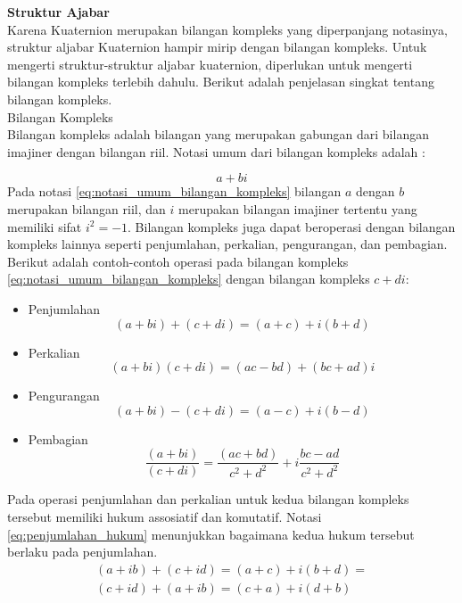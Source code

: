 \documentclass[a4paper,twoside]{article}
\begin{document}
\begin{enumerate}
\textbf{Struktur Ajabar}\\

Karena Kuaternion merupakan bilangan kompleks yang diperpanjang notasinya, struktur aljabar Kuaternion hampir mirip dengan bilangan kompleks. Untuk mengerti struktur-struktur aljabar kuaternion, diperlukan untuk mengerti  bilangan kompleks terlebih dahulu. Berikut adalah penjelasan singkat tentang bilangan kompleks. \\

Bilangan Kompleks\\

\label{sssec:bilangan_kompleks}
\cite{kuipers:1999}
Bilangan kompleks adalah bilangan yang merupakan gabungan dari bilangan imajiner dengan bilangan riil. Notasi umum dari bilangan kompleks adalah :

\begin{equation}
	a+bi
\label{eq:notasi_umum_bilangan_kompleks}
\end{equation}
Pada notasi \ref{eq:notasi_umum_bilangan_kompleks} bilangan \(a\) dengan \(b\) merupakan bilangan riil, dan \(i\) merupakan bilangan imajiner tertentu yang memiliki sifat \(i^2=-1\). Bilangan kompleks juga dapat beroperasi dengan bilangan kompleks lainnya seperti penjumlahan, perkalian, pengurangan, dan pembagian. Berikut adalah contoh-contoh operasi pada bilangan kompleks \ref{eq:notasi_umum_bilangan_kompleks} dengan bilangan kompleks \(c+di\):
\begin{itemize}
	\item Penjumlahan\\
	\[
	 (a + bi) + (c + di) = (a+c) + i(b+d)
	\]
	\item Perkalian\\
	\[
	 (a + bi)(c + di) = (ac−bd) + (bc+ad)i
	\]
	\item Pengurangan\\
	\[
	 (a + bi) - (c + di) = (a-c) + i(b-d)
	\]
	\item Pembagian\\
	\[
	 \frac{(a + bi)}{(c + di)} = \frac{(ac+bd)}{c^2+d^2} + i \frac{bc-ad}{c^2+d^2}
	\]
\end{itemize}
Pada operasi penjumlahan dan perkalian untuk kedua bilangan kompleks tersebut memiliki hukum assosiatif dan komutatif. Notasi \ref{eq:penjumlahan_hukum} menunjukkan bagaimana  kedua hukum tersebut berlaku pada penjumlahan.
\begin{equation}
	\begin{split}
	(a+ib) + (c+id) = (a+c) + i(b+d)=\\
	(c+id) + (a+ib) = (c+a) + i(d+b)
	\end{split}
\label{eq:penjumlahan_hukum}
\end{equation}


\end{enumerate}
\end{document}
